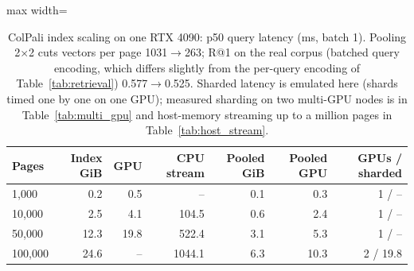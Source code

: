 \begin{table}[t]
\centering
\caption{ColPali index scaling on one RTX 4090: p50 query latency (ms, batch 1). Pooling 2$\times$2 cuts vectors per page 1031$\to$263; R@1 on the real corpus (batched query encoding, which differs slightly from the per-query encoding of Table~\ref{tab:retrieval}) 0.577$\to$0.525. Sharded latency is emulated here (shards timed one by one on one GPU); measured sharding on two multi-GPU nodes is in Table~\ref{tab:multi_gpu} and host-memory streaming up to a million pages in Table~\ref{tab:host_stream}.}
\label{tab:index_scaling}
\begin{adjustbox}{max width=\linewidth}
\begin{tabular}{lrrrrrr}
\toprule
\textbf{Pages} & \textbf{Index GiB} & \textbf{GPU} & \textbf{CPU stream} & \textbf{Pooled GiB} & \textbf{Pooled GPU} & \textbf{GPUs / sharded} \\
\midrule
1,000 & 0.2 & 0.5 & -- & 0.1 & 0.3 & 1 / -- \\
10,000 & 2.5 & 4.1 & 104.5 & 0.6 & 2.4 & 1 / -- \\
50,000 & 12.3 & 19.8 & 522.4 & 3.1 & 5.3 & 1 / -- \\
100,000 & 24.6 & -- & 1044.1 & 6.3 & 10.3 & 2 / 19.8 \\
\bottomrule
\end{tabular}
\end{adjustbox}
\end{table}
